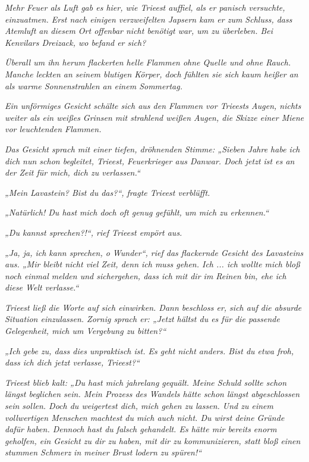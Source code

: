 \textit{Mehr Feuer als Luft gab es hier, wie Trieest auffiel, als er panisch versuchte, einzuatmen. Erst nach einigen verzweifelten Japsern kam er zum Schluss, dass Atemluft an diesem Ort offenbar nicht benötigt war, um zu überleben. Bei Kenvilars Dreizack, wo befand er sich?}

\textit{Überall um ihn herum flackerten helle Flammen ohne Quelle und ohne Rauch. Manche leckten an seinem blutigen Körper, doch fühlten sie sich kaum heißer an als warme Sonnenstrahlen an einem Sommertag.}

\textit{Ein unförmiges Gesicht schälte sich aus den Flammen vor Trieests Augen, nichts weiter als ein weißes Grinsen mit strahlend weißen Augen, die Skizze einer Miene vor leuchtenden Flammen.}

\textit{Das Gesicht sprach mit einer tiefen, dröhnenden Stimme: „Sieben Jahre habe ich dich nun schon begleitet, Trieest, Feuerkrieger aus Danwar. Doch jetzt ist es an der Zeit für mich, dich zu verlassen.“}

\textit{„Mein Lavastein? Bist du das?“, fragte Trieest verblüfft.}

\textit{„Natürlich! Du hast mich doch oft genug gefühlt, um mich zu erkennen.“}

\textit{„Du kannst sprechen?!“, rief Trieest empört aus.}

\textit{„Ja, ja, ich kann sprechen, o Wunder“, rief das flackernde Gesicht des Lavasteins aus. „Mir bleibt nicht viel Zeit, denn ich muss gehen. Ich ... ich wollte mich bloß noch einmal melden und sichergehen, dass ich mit dir im Reinen bin, ehe ich diese Welt verlasse.“}

\textit{Trieest ließ die Worte auf sich einwirken. Dann beschloss er, sich auf die absurde Situation einzulassen. Zornig sprach er: „Jetzt hältst du es für die passende Gelegenheit, mich um Vergebung zu bitten?“}

\textit{„Ich gebe zu, dass dies unpraktisch ist. Es geht nicht anders. Bist du etwa froh, dass ich dich jetzt verlasse, Trieest?“}

\textit{Trieest blieb kalt: „Du hast mich jahrelang gequält. Meine Schuld sollte schon längst beglichen sein. Mein Prozess des Wandels hätte schon längst abgeschlossen sein sollen. Doch du weigertest dich, mich gehen zu lassen. Und zu einem vollwertigen Menschen machtest du mich auch nicht. Du wirst deine Gründe dafür haben. Dennoch hast du falsch gehandelt. Es hätte mir bereits enorm geholfen, ein Gesicht zu dir zu haben, mit dir zu kommunizieren, statt bloß einen stummen Schmerz in meiner Brust lodern zu spüren!“}

